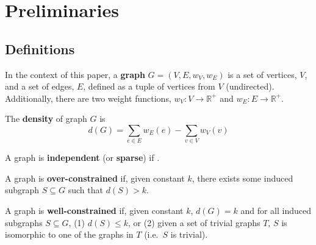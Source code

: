 \section{Preliminaries}

\subsection{Definitions}





\begin{definition}
   In the context of this paper, a \textbf{graph} $G=(V,E,w_V,w_E)$ is a set of vertices, $V$, and a set of edges, $E$, defined as a tuple of vertices from $V$ (undirected). Additionally, there are two weight functions, $w_V: V \to \mathbb{R}^+$ and $w_E: E \to \mathbb{R}^+$.
\end{definition}

\begin{definition}
    The \textbf{density} of graph $G$ is
    \begin{equation}
        d(G) = \sum_{e\in E}{w_E(e)} - \sum_{v\in V}{w_V(v)}
    \end{equation}
\end{definition}

\begin{definition}
    A graph is \textbf{independent} (or \textbf{sparse}) if .
\end{definition}

\begin{definition}
    A graph is \textbf{over-constrained} if, given constant $k$, there exists some induced subgraph $S\subseteq G$ such that $d(S) > k$.
\end{definition}

\begin{definition}
    A graph is \textbf{well-constrained} if, given constant $k$, $d(G) = k$ and for all induced subgraphs $S\subseteq G$, (1) $d(S)\leq k$, or (2) given a set of trivial graphs $T$, $S$ is isomorphic to one of the graphs in $T$ (i.e.\ $S$ is trivial).
\end{definition}

